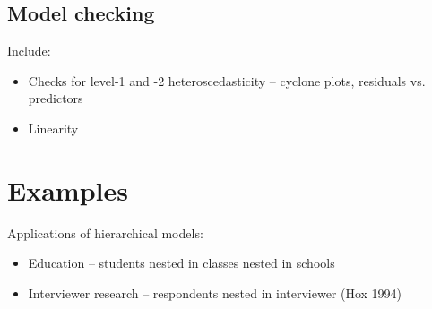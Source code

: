 \documentclass{article} %
\begin{document}

\subsection{Model checking}

Include:
\begin{itemize}
\item Checks for level-1 and -2 heteroscedasticity -- cyclone plots, residuals vs. predictors
\item Linearity

\end{itemize}


\section{Examples}
Applications of hierarchical models:
\begin{itemize}
\item Education -- students nested in classes nested in schools
\item Interviewer research -- respondents nested in interviewer (Hox 1994)
\end{itemize}
\end{document}
